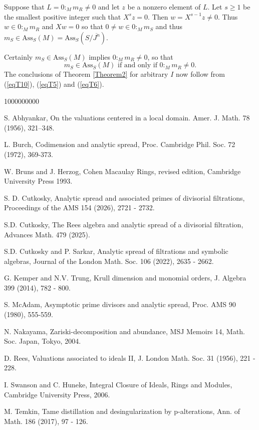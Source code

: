 \documentclass[11pt]{amsart}
\theoremstyle{definition}
\begin{document}
Suppose that $L=0:_Mm_R\ne 0$ and let $z$ be a nonzero element of $L$.  Let $s\ge 1$ be the smallest positive integer such that $X^sz=0$. Then $w=X^{s-1}z\ne 0$. Thus $w\in 0:_Mm_R$ and $Xw=0$ so that $0\ne w\in 0:_Mm_S$ and thus $m_S\in\mbox{Ass}_S(M)=\mbox{Ass}_S(S/\overline{J^n})$.

Certainly $m_S\in \mbox{Ass}_S(M)$ implies $0:_Mm_R\ne 0$, so that 
$$
m_S\in \mbox{Ass}_S(M)\mbox{ if and only if }0:_Mm_R\ne 0.
$$
The conclusions of Theorem \ref{Theorem2} for arbitrary $I$ now follow from (\ref{eqT10}), (\ref{eqT5}) and (\ref{eqT6}).

\begin{thebibliography}{1000000000}


 S. Abhyankar, On the valuations centered in a local domain. Amer.
J. Math. 78 (1956), 321–348.

 L. Burch, Codimension and analytic spread, Proc. Cambridge Phil. Soc. 72 (1972), 369-373.

 W. Bruns and J. Herzog, Cohen Macaulay Rings, revised edition, Cambridge University Press 1993.


 S. D. Cutkosky, Analytic spread and associated primes of divisorial filtrations,
Proceedings of the AMS 154 (2026), 2721 - 2732.

 S.D. Cutkosky, The Rees algebra and analytic spread of a divisorial filtration,
Advances Math. 479 (2025).

 S.D. Cutkosky and P. Sarkar, Analytic spread of filtrations and symbolic algebras, Journal of the London Math. Soc. 106 (2022), 2635 - 2662.

 G. Kemper and N.V. Trung, Krull dimension and monomial orders, J. Algebra 399 (2014), 782 - 800.

  S. McAdam, Asymptotic prime divisors and analytic spread, Proc. AMS 90 (1980), 555-559.

 N. Nakayama, Zariski-decomposition and abundance, MSJ Memoirs 14, Math. Soc. Japan,
Tokyo, 2004.

 D. Rees, Valuations associated to ideals II, J. London Math. Soc. 31 (1956), 221 - 228.

 I. Swanson and C. Huneke, Integral Closure of Ideals, Rings and Modules, Cambridge University Press, 2006.

 M. Temkin, Tame distillation and desingularization by p-alterations, Ann. of Math.
186 (2017), 97 - 126.

\end{thebibliography}
\end{document}
